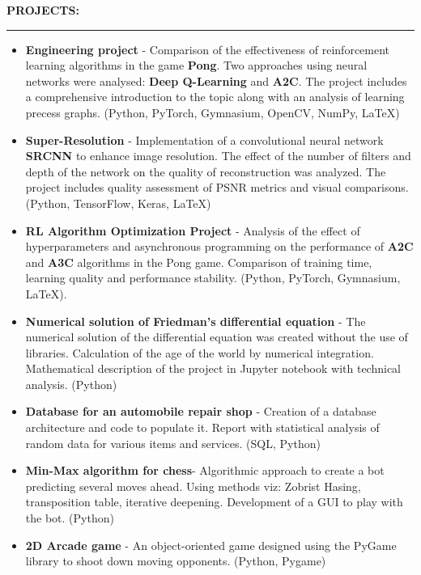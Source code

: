 \documentclass[10pt]{article}
\newcommand{\longline}{\rule{19.6cm}{1pt}}
\begin{document}
\noindent \fontsize{14pt}{14pt}\selectfont \textbf{\color{Violet}PROJECTS:}
\fontsize{10pt}{10pt}\selectfont
\\
\noindent \longline 
\begin{itemize}[leftmargin=*]
    \item \textbf{Engineering project} - Comparison of the effectiveness of reinforcement learning algorithms in the game \textbf{Pong}. 
    Two approaches using neural networks were analysed: \textbf{Deep Q-Learning} and \textbf{A2C}.
    The project includes a comprehensive introduction to the topic along with an analysis of learning precess graphs. (Python, PyTorch, Gymnasium, OpenCV, NumPy, LaTeX)
    \item \textbf{Super-Resolution} - Implementation of a convolutional neural network \textbf{SRCNN} to enhance image resolution.
    The effect of the number of filters and depth of the network on the quality of reconstruction was analyzed.
    The project includes quality assessment of PSNR metrics and visual comparisons. (Python, TensorFlow, Keras, LaTeX)
    \item \textbf{RL Algorithm Optimization Project} - Analysis of the effect of hyperparameters and asynchronous programming on the performance of \textbf{A2C} and \textbf{A3C} algorithms in the Pong game. 
    Comparison of training time, learning quality and performance stability. (Python, PyTorch, Gymnasium, LaTeX).
    \item \textbf{Numerical solution of Friedman's differential equation} - The numerical solution of the differential equation
    was created without the use of libraries. Calculation of the age of the world by numerical integration. Mathematical description of the
    project in Jupyter notebook with technical analysis. (Python)
    \item \textbf{Database for an automobile repair shop} - Creation of a database architecture and code to populate it.
    Report with statistical analysis of random data for various items and services. (SQL, Python)
    \item \textbf{Min-Max algorithm for chess}- Algorithmic approach to create a bot predicting several moves ahead.
    Using methods viz: Zobrist Hasing, transposition table, iterative deepening. Development of a GUI to play with the bot. (Python)
    \item \textbf{2D Arcade game} - An object-oriented game designed using the PyGame library to shoot down moving opponents. (Python, Pygame)
\end{itemize}
\end{document}
